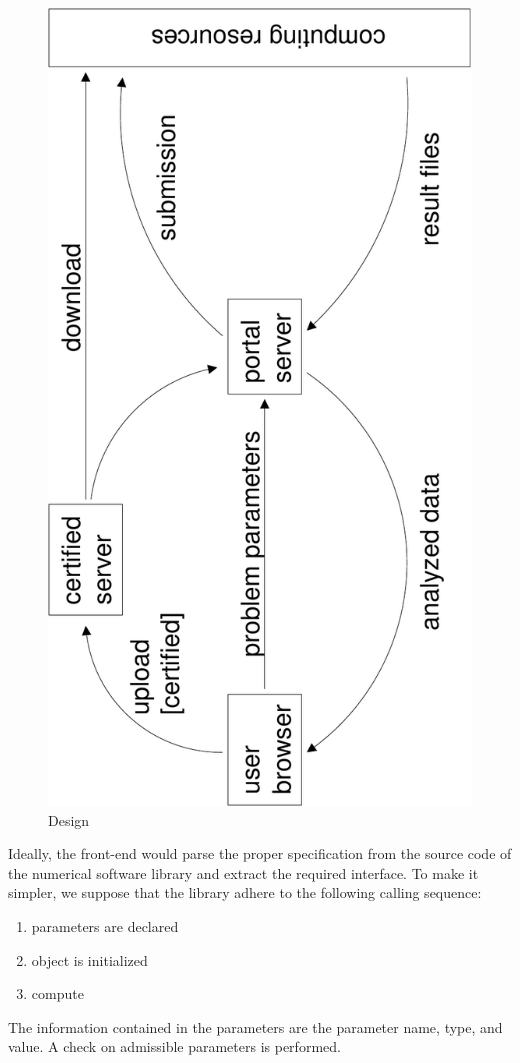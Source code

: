 \documentclass[11pt,relax]{SANDreport}
\begin{document}
\begin{figure}
\begin{center}
\includegraphics[width=14cm]{portal_design}
\caption{Design}
\end{center}
\label{fig:design}
\end{figure}

Ideally, the front-end would parse the proper specification from the source
code of the numerical software library and extract the required interface. To
make it simpler, we suppose that the library adhere to the following calling
sequence:
\begin{enumerate}
\item parameters are declared
\item object is initialized
\item compute
\end{enumerate}
The information contained in the parameters are the parameter name, type, and
value. A check on admissible parameters is performed.
\end{document}
